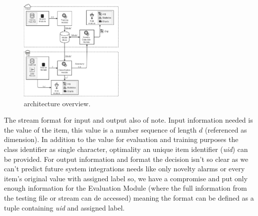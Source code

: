 \documentclass[conference]{IEEEtran}
\begin{document}
\begin{figure}[htbp]
\centerline{\includegraphics[width=0.45\textwidth]{figures/mfog-arch-v2_en.png}}
\caption{\mfog architecture overview.}
\label{fig:mfog-architecture}
\end{figure}


The stream format for input and output also of note.
Input information needed is the value of the item, this value is a number
sequence of length $d$ (referenced as dimension).
In addition to the value for evaluation and training purposes the class
identifier as single character, optimality an unique item identifier
(\textit{uid}) can be provided.
For output information and format the decision isn't so clear as we can't
predict future system integrations needs like only novelty alarms or every
item's original value with assigned label so, we have a compromise and put only
enough information for the Evaluation Module (where the full information
from the testing file or stream can de accessed) meaning the format can be
defined as a tuple containing \textit{uid} and assigned label.
\end{document}
